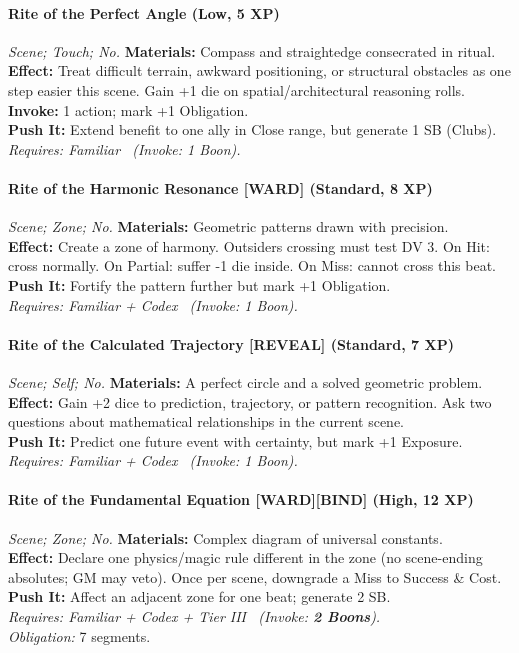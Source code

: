 \paragraph*{Rite of the Perfect Angle (Low, 5 XP)} \emph{Scene; Touch; No.}
\textbf{Materials:} Compass and straightedge consecrated in ritual.\\
\textbf{Effect:} Treat difficult terrain, awkward positioning, or structural obstacles as one step easier this scene. Gain +1 die on spatial/architectural reasoning rolls.\\
\textbf{Invoke:} 1 action; mark +1 Obligation.\\
\textbf{Push It:} Extend benefit to one ally in Close range, but generate 1 SB (Clubs).\\
\emph{Requires: Familiar \ (\textit{Invoke:} 1 Boon).}

\paragraph{Rite of the Harmonic Resonance \textnormal{[WARD]} (Standard, 8 XP)} \emph{Scene; Zone; No.}
\textbf{Materials:} Geometric patterns drawn with precision.\\
\textbf{Effect:} Create a zone of harmony. Outsiders crossing must test DV 3. On Hit: cross normally. On Partial: suffer -1 die inside. On Miss: cannot cross this beat.\\
\textbf{Push It:} Fortify the pattern further but mark +1 Obligation.\\
\emph{Requires: Familiar + Codex \ (\textit{Invoke:} 1 Boon).}

\paragraph{Rite of the Calculated Trajectory \textnormal{[REVEAL]} (Standard, 7 XP)} \emph{Scene; Self; No.}
\textbf{Materials:} A perfect circle and a solved geometric problem.\\
\textbf{Effect:} Gain +2 dice to prediction, trajectory, or pattern recognition. Ask two questions about mathematical relationships in the current scene.\\
\textbf{Push It:} Predict one future event with certainty, but mark +1 Exposure.\\
\emph{Requires: Familiar + Codex \ (\textit{Invoke:} 1 Boon).}

\paragraph{Rite of the Fundamental Equation \textnormal{[WARD][BIND]} (High, 12 XP)} \emph{Scene; Zone; No.}
\textbf{Materials:} Complex diagram of universal constants.\\
\textbf{Effect:} Declare one physics/magic rule different in the zone (no scene-ending absolutes; GM may veto). Once per scene, downgrade a Miss to Success \& Cost.\\
\textbf{Push It:} Affect an adjacent zone for one beat; generate 2 SB.\\
\emph{Requires: Familiar + Codex + Tier III \ (\textit{Invoke:} \textbf{2 Boons}).}\\
\emph{Obligation:} 7 segments.

